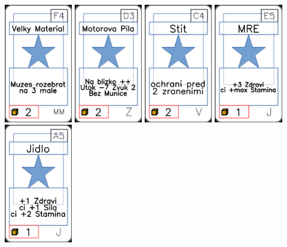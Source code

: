 \documentclass[a4paper]{article}
\begin{document}
	\includegraphics[width=3.0cm]{img-1_58}
	\includegraphics[width=3.0cm]{img-1_107}
	\includegraphics[width=3.0cm]{img-1_73}
	\includegraphics[width=3.0cm]{img-1_24}
	\includegraphics[width=3.0cm]{img-1_4}
\end{document}
